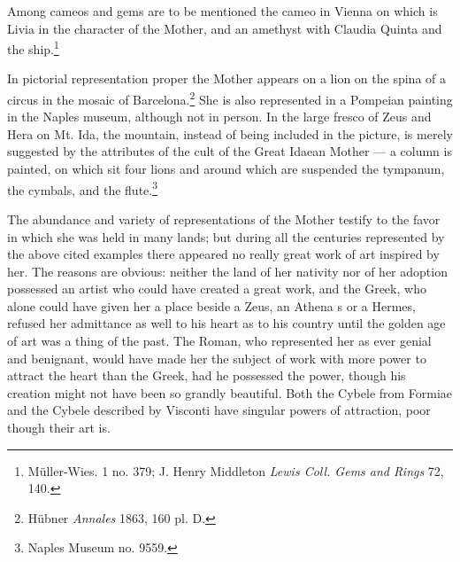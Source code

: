 \documentclass[a4paper, 11pt, oneside, polutonikogreek, english]{article}
\begin{document}
Among cameos and gems are to be mentioned the cameo in Vienna on which is Livia in the character of the Mother, and an amethyst with Claudia Quinta and the ship.\footnote{Müller-Wies. 1 no. 379; J. Henry Middleton \emph{Lewis Coll. Gems and Rings} 72, 140.}

In pictorial representation proper the Mother appears on a lion on the spina of a circus in the mosaic of Barcelona.\footnote{Hübner \emph{Annales} 1863, 160 pl. D.} She is also represented in a Pompeian painting in the Naples museum, although not in person. In the large fresco of Zeus and Hera on Mt. Ida, the mountain, instead of being included in the picture, is merely suggested by the attributes of the cult of the Great Idaean Mother --- a column is painted, on which sit four lions and around which are suspended the tympanum, the cymbals, and the flute.\footnote{Naples Museum no. 9559.}

The abundance and variety of representations of the Mother testify to the favor in which she was held in many lands; but during all the centuries represented by the above cited examples there appeared no really great work of art inspired by her. The reasons are obvious: neither the land of her nativity nor of her adoption possessed an artist who could have created a great work, and the Greek, who alone could have given her a place beside a Zeus, an Athena s or a Hermes, refused her admittance as well to his heart as to his country until the golden age of art was a thing of the past. The Roman, who represented her as ever genial and benignant, would have made her the subject of work with more power to attract the heart than the Greek, had he possessed the power, though his creation might not have been so grandly beautiful. Both the Cybele from Formiae and the Cybele described by Visconti have singular powers of attraction, poor though their art is.
\end{document}
